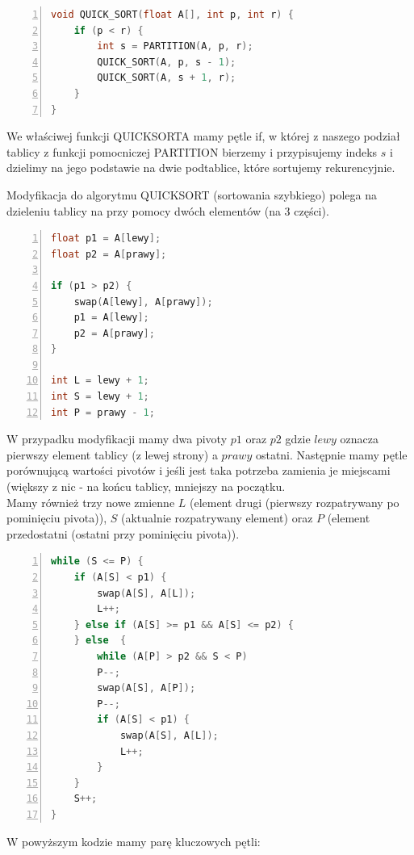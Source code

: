 \documentclass{article}
\begin{document}
\begin{lstlisting}[language=C++, caption={Kod funkcji sortowania szybkiego}, numbers=left, frame=single, xleftmargin=20pt]
void QUICK_SORT(float A[], int p, int r) {
	if (p < r) {
		int s = PARTITION(A, p, r);
		QUICK_SORT(A, p, s - 1);
		QUICK_SORT(A, s + 1, r);
	}
}
\end{lstlisting}

\large{We właściwej funkcji QUICKSORTA mamy pętle if, w której z naszego podział tablicy z funkcji pomocniczej PARTITION bierzemy i przypisujemy indeks $s$ i dzielimy na jego podstawie na dwie podtablice, które sortujemy rekurencyjnie.}

\newpage

\large{Modyfikacja do algorytmu QUICKSORT (sortowania szybkiego) polega na dzieleniu tablicy na przy pomocy dwóch elementów (na 3 części).}

\begin{lstlisting}[language=C++, caption={Kod funkcji sortowania szybkiego z modyfikacją}, numbers=left, frame=single, xleftmargin=20pt]
float p1 = A[lewy];
float p2 = A[prawy];

if (p1 > p2) {
	swap(A[lewy], A[prawy]);
	p1 = A[lewy];
	p2 = A[prawy];
}

int L = lewy + 1;
int S = lewy + 1;
int P = prawy - 1;
\end{lstlisting}

\large{W przypadku modyfikacji mamy dwa pivoty $p1$ oraz $p2$ gdzie $lewy$ oznacza pierwszy element tablicy (z lewej strony) a $prawy$ ostatni. Następnie mamy pętle porównującą wartości pivotów i jeśli jest taka potrzeba zamienia je miejscami (większy z nic - na końcu tablicy, mniejszy na początku.}
\\

\large{Mamy również trzy nowe zmienne $L$ (element drugi (pierwszy rozpatrywany po pominięciu pivota)), $S$ (aktualnie rozpatrywany element) oraz $P$ (element przedostatni (ostatni przy pominięciu pivota)).}

\begin{lstlisting}[language=C++, caption={Kod funkcji sortowania szybkiego z modyfikacją}, numbers=left, frame=single, xleftmargin=20pt]
while (S <= P) {
	if (A[S] < p1) {
		swap(A[S], A[L]);
		L++;
	} else if (A[S] >= p1 && A[S] <= p2) {
	} else	{
		while (A[P] > p2 && S < P) 
		P--;
		swap(A[S], A[P]);
		P--;
		if (A[S] < p1) {
			swap(A[S], A[L]);
			L++;
		}
	}
	S++;
}
\end{lstlisting}

\large{W powyższym kodzie mamy parę kluczowych pętli:}
\end{document}
